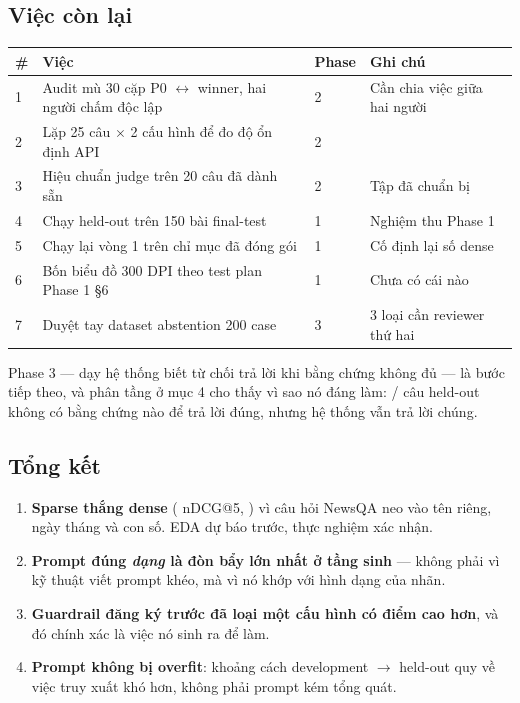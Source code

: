 \subsection{Việc còn lại}

\begin{center}\small
\begin{tabularx}{0.94\textwidth}{@{}p{0.7cm} L p{1.2cm} p{3.2cm}@{}}
\toprule
\textbf{\#} & \textbf{Việc} & \textbf{Phase} & \textbf{Ghi chú} \\
 & Audit mù 30 cặp P0 $\leftrightarrow$ winner, hai người chấm độc lập & 2 & Cần chia việc giữa hai người \\
2 & Lặp 25 câu $\times$ 2 cấu hình để đo độ ổn định API & 2 & \\
3 & Hiệu chuẩn judge trên 20 câu đã dành sẵn & 2 & Tập đã chuẩn bị \\
4 & Chạy held-out trên 150 bài final-test & 1 & Nghiệm thu Phase 1 \\
5 & Chạy lại vòng 1 trên chỉ mục đã đóng gói & 1 & Cố định lại số dense \\
6 & Bốn biểu đồ 300 DPI theo test plan Phase 1 §6 & 1 & Chưa có cái nào \\
7 & Duyệt tay dataset abstention 200 case & 3 & 3 loại cần reviewer thứ hai \\
\bottomrule
\end{tabularx}
\end{center}

Phase 3 --- dạy hệ thống biết từ chối trả lời khi bằng chứng không đủ --- là
bước tiếp theo, và phân tầng ở mục 4 cho thấy vì sao nó đáng làm:
\NumHoNMiss{}/\NumNHeldout{} câu held-out không có bằng chứng nào để trả lời
đúng, nhưng hệ thống vẫn trả lời chúng.

\subsection{Tổng kết}

\begin{enumerate}\small
  \item \textbf{Sparse thắng dense} (\NumSparseVsDense{} nDCG@5,
        \NumSparseVsDenseCI{}) vì câu hỏi NewsQA neo vào tên riêng, ngày tháng
        và con số. EDA dự báo trước, thực nghiệm xác nhận.
  \item \textbf{Prompt đúng \emph{dạng} là đòn bẩy lớn nhất ở tầng sinh} ---
        không phải vì kỹ thuật viết prompt khéo, mà vì nó khớp với hình dạng
        của nhãn.
  \item \textbf{Guardrail đăng ký trước đã loại một cấu hình có điểm cao hơn},
        và đó chính xác là việc nó sinh ra để làm.
  \item \textbf{Prompt không bị overfit}: khoảng cách development $\rightarrow$
        held-out quy về việc truy xuất khó hơn, không phải prompt kém tổng quát.
\end{enumerate}

